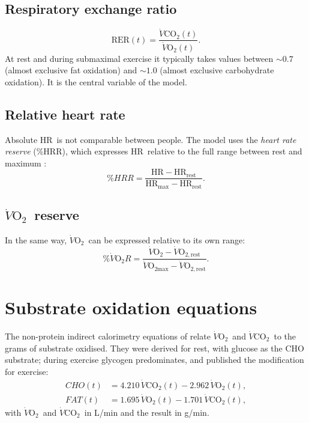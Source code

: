 \documentclass[10pt,a4paper]{article}
\newcommand{\VO}{\ensuremath{\dot V\mathrm{O_2}}}
\newcommand{\VCO}{\ensuremath{\dot V\mathrm{CO_2}}}
\newcommand{\VOmax}{\ensuremath{\dot V\mathrm{O_{2max}}}}
\newcommand{\RER}{\ensuremath{\mathrm{RER}}}
\newcommand{\FC}{\ensuremath{\mathrm{HR}}}
\begin{document}
\subsection{Respiratory exchange ratio}
\begin{equation}
  \RER(t)=\frac{\VCO(t)}{\VO(t)} .
\end{equation}
At rest and during submaximal exercise it typically takes values between $\sim0.7$ (almost
exclusive fat oxidation) and $\sim1.0$ (almost exclusive carbohydrate oxidation). It is the
central variable of the model.

\subsection{Relative heart rate}
Absolute \FC\ is not comparable between people. The model uses the \emph{heart rate
reserve} (\%HRR), which expresses \FC\ relative to the full range between rest and maximum
\citep{karvonen1957}:
\begin{equation}
  \%HRR=\frac{\FC-\FC_{\mathrm{rest}}}{\FC_{\mathrm{max}}-\FC_{\mathrm{rest}}} .
\end{equation}

\subsection{\VO\ reserve}
In the same way, \VO\ can be expressed relative to its own range:
\begin{equation}
  \%\dot V\mathrm{O_2}R=\frac{\VO-\dot V\mathrm{O_{2,rest}}}{\VOmax-\dot V\mathrm{O_{2,rest}}} .
\end{equation}

\section{Substrate oxidation equations}\label{sec:jw}

The non-protein indirect calorimetry equations of \citet{frayn1983} relate \VO\ and \VCO\
to the grams of substrate oxidised. They were derived for rest, with glucose as the CHO
substrate; during exercise glycogen predominates, and \citet{jeukendrup2005} published the
modification for exercise:
\begin{align}
  CHO(t) &= 4.210\,\VCO(t)-2.962\,\VO(t), \label{eq:jw-cho}\\
  FAT(t) &= 1.695\,\VO(t)-1.701\,\VCO(t), \label{eq:jw-fat}
\end{align}
with \VO\ and \VCO\ in L/min and the result in g/min.
\end{document}

